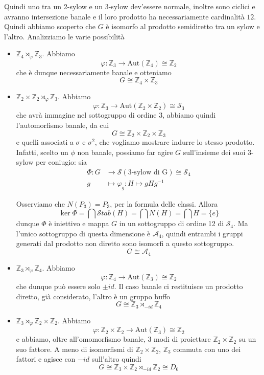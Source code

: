 \documentclass[a4paper]{article}
\theoremstyle{remark}
\theoremstyle{definition}
\newcommand{\Aut}[1]{\mathrm{Aut}\left( #1 \right)}
\newcommand{\Stab}[1]{\mathcal{S}tab\left( #1 \right)}
\newcommand{\Z}{\mathbb{Z}}
\newcommand{\fun}[5]{
	\begin{align*}
	#1 \colon #2 &\to #3 \\
	#4 &\mapsto #5
	\end{align*}
}
\begin{document}
\begin{multicols}{2}
Quindi uno tra un 2-sylow e un 3-sylow dev'essere normale, inoltre sono ciclici e avranno intersezione banale e il loro prodotto ha necessariamente cardinalità $ 12 $. Quindi abbiamo scoperto che $ G $ è isomorfo al prodotto semidiretto tra un sylow e l'altro. Analizziamo le varie possibilità

\begin{itemize}
	\item $ \Z_4 \rtimes_\varphi \Z_3 $. Abbiamo
	\[ \varphi : \Z_3 \to \Aut{\Z_4} \cong \Z_2 \]
	che è dunque necessariamente banale e otteniamo
	\[ \boxed{G \cong \Z_4 \times \Z_3} \]
	\item $ \Z_2 \times \Z_2 \rtimes_\varphi \Z_3 $. Abbiamo
	\[ \varphi : \Z_3 \to \Aut{\Z_2\times\Z_2} \cong \mathcal{S}_3 \]
	che avrà immagine nel sottogruppo di ordine $ 3 $, abbiamo quindi l'automorfismo banale, da cui
	\[  \boxed{G \cong \Z_2 \times \Z_2 \times \Z_3} \]
	e quelli associati a $ \sigma $ e $ \sigma^2 $, che vogliamo mostrare indurre lo stesso prodotto. Infatti, scelto un $ \phi $ non banale, possiamo far agire $ G $ sull'insieme dei suoi 3-sylow per coniugio: sia \fun{\Phi}{G}{\mathcal{S}({\text{3-sylow di G}})\cong \mathcal{S}_4}{g}{\varphi_g : H \mapsto gHg^{-1}}
	Osserviamo che $ N(P_3) = P_3 $, per la formula delle classi. Allora $$  \ker\Phi = \bigcap \Stab{H} = \bigcap N(H) = \bigcap H = \{ e \}  $$ dunque $ \Phi $ è iniettivo e mappa $ G $ in un sottogruppo di ordine 12 di $ \mathcal{S}_4 $. Ma l'unico sottogruppo di questa dimensione è $ \mathcal{A}_4 $, quindi entrambi i gruppi generati dal prodotto non diretto sono isomorfi a questo sottogruppo.
	\[ \boxed{G \cong \mathcal{A}_4} \]
	\item $ \Z_3 \rtimes_\varphi \Z_4 $. Abbiamo
	\[ \varphi : \Z_4 \to \Aut{\Z_3} \cong \Z_2 \]
	che dunque può essere solo $ \pm id $. Il caso banale ci restituisce un prodotto diretto, già considerato, l'altro è un gruppo buffo
	\[ \boxed{G \cong \Z_3 \rtimes_{-id} \Z_4} \]
	\item $ \Z_3 \rtimes_\varphi \Z_2 \times \Z_2  $. Abbiamo
	\[ \varphi : \Z_2 \times \Z_2  \to \Aut{\Z_3} \cong \Z_2 \]
	e abbiamo, oltre all'omomorfismo banale, 3 modi di proiettare $ \Z_2 \times \Z_2  $ su un suo fattore. A meno di isomorfismi di $ \Z_2 \times \Z_2  $, $ \Z_3 $ commuta con uno dei fattori e agisce con $ -id $ sull'altro quindi
	\[ \boxed{G \cong \Z_3\times \Z_2 \rtimes_{-id} \Z_2 \cong D_6} \]
\end{itemize}




\end{multicols}
\end{document}
